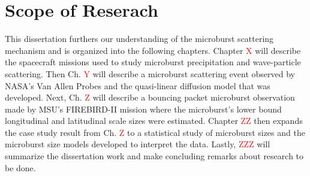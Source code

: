 \section{Scope of Reserach}\label{Intro:scope}
This dissertation furthers our understanding of the microburst scattering mechanism and is organized into the following chapters. Chapter \textcolor{red}{X} will describe the spacecraft missions used to study microburst precipitation and wave-particle scattering. Then Ch. \textcolor{red}{Y} will describe a microburst scattering event observed by NASA's Van Allen Probes and the quasi-linear diffusion model that was developed. Next, Ch. \textcolor{red}{Z} will describe a bouncing packet microburst observation made by MSU's FIREBIRD-II mission where the microburst's lower bound longitudinal and latitudinal scale sizes were estimated. Chapter \textcolor{red}{ZZ} then expands the case study result from Ch. \textcolor{red}{Z} to a statistical study of microburst sizes and the microburst size models developed to interpret the data. Lastly, \textcolor{red}{ZZZ} will summarize the dissertation work and make concluding remarks about research to be done.